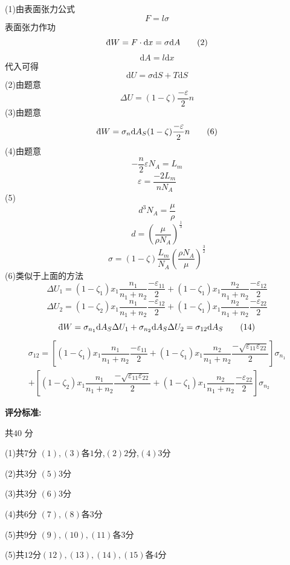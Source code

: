 \documentclass{article}
\begin{document}
\[\]
(1)由表面张力公式
\[F=l\sigma\tag{1}\]
表面张力作功
\[{\; \bar{} \hspace{-0.3em} \mathrm d} W=F\cdot \mathrm{d}x=\sigma\mathrm{d}A\tag{2}\]
\[\mathrm{d}A=l\mathrm{d}x\tag{3}\]
代入可得
\[\mathrm{d}U=\sigma\mathrm{d}S+T\mathrm{d}S\tag{4}\]
(2)由题意
\[
\Delta U=(1-\zeta)\dfrac{-\varepsilon}{2}n
\tag{5}\]
(3)由题意
\[
{\; \bar{} \hspace{-0.3em} \mathrm d} W=\sigma_n\mathrm{d}A_S(1-\zeta)\dfrac{- \varepsilon}{2}n
\tag{6}\]
(4)由题意
\[
-\dfrac{n}{2}\varepsilon N_A=L_m
\tag{7}\]
\[
\varepsilon=\dfrac{-2L_m}{nN_A}
\tag{8}\]
(5)
\[
d^3N_A=\dfrac{\mu}{\rho}
\tag{9}\]
\[
d=\left(\dfrac{\mu}{\rho N_A}\right)^{\frac{1}{3}}
\tag{10}\]
\[
\sigma=(1-\zeta)\dfrac{L_m}{N_A}\left(\dfrac{\rho N_A}{\mu}\right)^{\frac{3}{2}}
\tag{11}\]
(6)类似于上面的方法
\[
\Delta U_1=(1-\zeta_1)x_1\dfrac{n_1}{n_1+n_2}\dfrac{-\varepsilon_{11}}{2}+(1-\zeta_1)x_1\dfrac{n_2}{n_1+n_2}\dfrac{-\varepsilon_{12}}{2}
\tag{12}\]
\[
\Delta U_2=(1-\zeta_2)x_1\dfrac{n_1}{n_1+n_2}\dfrac{-\varepsilon_{12}}{2}+(1-\zeta_1)x_1\dfrac{n_2}{n_1+n_2}\dfrac{-\varepsilon_{22}}{2}
\tag{13}\]
\[
{\; \bar{} \hspace{-0.3em} \mathrm d} W=\sigma_{n_1}\mathrm{d} A_S \Delta U_1+\sigma_{n_2}\mathrm{d} A_S \Delta U_2=\sigma_{12}\mathrm{d} A_S
\tag{14}\]
\[
\begin{aligned}
\sigma_{12}=\left[(1-\zeta_1)x_1\dfrac{n_1}{n_1+n_2}\dfrac{-\varepsilon_{11}}{2}+(1-\zeta_1)x_1\dfrac{n_2}{n_1+n_2}\dfrac{-\sqrt{\varepsilon_{11}\varepsilon_{22}}}{2}\right]\sigma_{n_1}\\
+\left[(1-\zeta_2)x_1\dfrac{n_1}{n_1+n_2}\dfrac{-\sqrt{\varepsilon_{11}\varepsilon_{22}}}{2}+(1-\zeta_1)x_1\dfrac{n_2}{n_1+n_2}\dfrac{-\varepsilon_{22}}{2}\right]\sigma_{n_2}
\end{aligned}
\tag{15}\]

\textbf{评分标准:}\par
共$40$ 分\par
(1)共$7$分 $(1),(3)$各$1$分,$(2)$$2$分,$(4)$$3$分\par
(2)共$3$分 $(5)$$3$分\par
(3)共$3$分 $(6)$$3$分\par
(4)共$6$分 $(7),(8)$各$3$分\par
(5)共$9$分 $(9),(10),(11)$各$3$分\par
(5)共$12$分$(12),(13),(14),(15)$各$4$分
\end{document}
